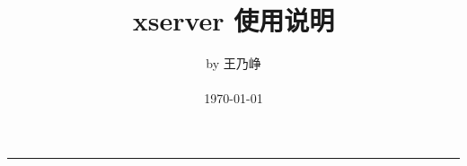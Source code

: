 \documentclass[a4paper,cs4size,oneside,cap]{ctexrep}
\title{\fontsize{50}{50}\selectfont%
    \vspace*{2cm}%
    \hfil xserver 使用说明%
    \vspace*{2cm}%
}
\author{
    \hfill by 王乃峥 \\
    \hfill \\
    \hfill \today \\
}
\makeatletter
\def\printtitle{%
    {\centering\@title}}
\def\printauthor{%
    {\centering\large\@author}}
\newcommand{\newchap}[1]{ \clearpage}
\makeatother
\begin{document}
\setlength{\parindent}{2em}
\setlength{\baselineskip}{1.4em}
\setlength{\parskip}{1ex}

\thispagestyle{empty}

\begin{center}
    \colorbox{Grey} {
        \parbox[t]{\textwidth}{
            \printtitle
        }
    }
\end{center}

\vspace*{0.4\textheight}
\printauthor
\hfill\rule{0.24\linewidth}{0.6pt}
\clearpage

\tableofcontents
\clearpage

\setcounter{page}{1}

\newchap{chap1}
\newchap{chap2}
\newchap{chap3}

\makeatletter
\listoftables
\listoffigures
\makeatother
\end{document}
